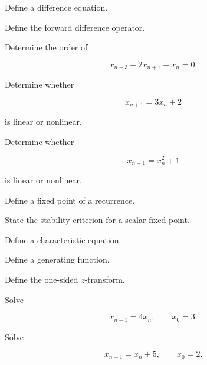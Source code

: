 \begin{exercise}[1]
Define a difference equation.
\end{exercise}

\begin{exercise}[1]
Define the forward difference operator.
\end{exercise}

\begin{exercise}[1]
Determine the order of

\[
x_{n+3}
-
2x_{n+1}
+
x_n
=
0.
\]
\end{exercise}

\begin{exercise}[1]
Determine whether

\[
x_{n+1}
=
3x_n+2
\]

is linear or nonlinear.
\end{exercise}

\begin{exercise}[1]
Determine whether

\[
x_{n+1}=x_n^2+1
\]

is linear or nonlinear.
\end{exercise}

\begin{exercise}[1]
Define a fixed point of a recurrence.
\end{exercise}

\begin{exercise}[1]
State the stability criterion for a scalar fixed point.
\end{exercise}

\begin{exercise}[1]
Define a characteristic equation.
\end{exercise}

\begin{exercise}[1]
Define a generating function.
\end{exercise}

\begin{exercise}[1]
Define the one-sided \(z\)-transform.
\end{exercise}

\begin{exercise}[2]
Solve

\[
x_{n+1}=4x_n,
\qquad
x_0=3.
\]
\end{exercise}

\begin{exercise}[2]
Solve

\[
x_{n+1}=x_n+5,
\qquad
x_0=2.
\]
\end{exercise}


